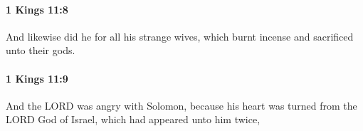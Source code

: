 		\paragraph{1 Kings 11:8} %
			\label{1KINGS-11-8}

			And likewise did he for all his strange wives, which burnt incense and sacrificed unto their gods.


		\paragraph{1 Kings 11:9} %
			\label{1KINGS-11-9}

			And the LORD was angry with Solomon, because his heart was turned from the LORD God of Israel, which had appeared unto him twice,


